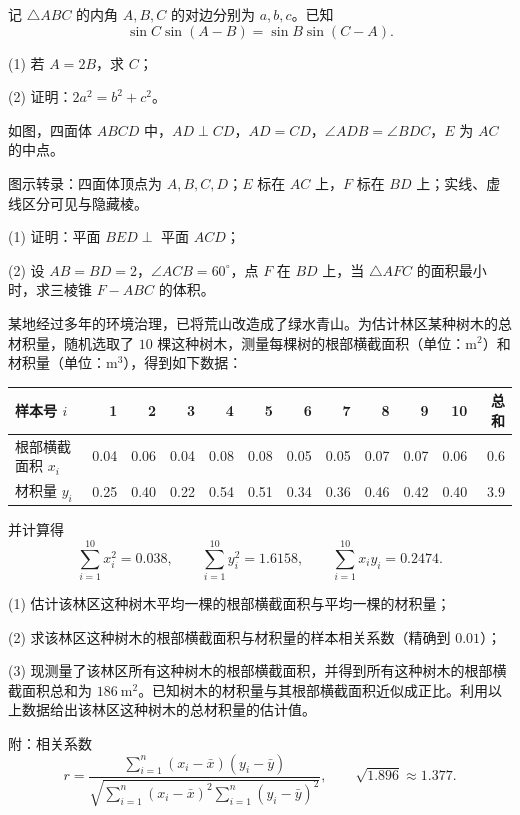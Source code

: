 \begin{question}
记 $\triangle ABC$ 的内角 $A,B,C$ 的对边分别为 $a,b,c$。已知
\nopagebreak[4]
\[
\sin C\sin(A-B)=\sin B\sin(C-A).
\]

(1) 若 $A=2B$，求 $C$；

(2) 证明：$2a^2=b^2+c^2$。

\Needspace{0.4\textheight}
\end{question}
\begin{question}
如图，四面体 $ABCD$ 中，$AD\perp CD$，$AD=CD$，$\angle ADB=\angle BDC$，$E$ 为 $AC$ 的中点。

图示转录：四面体顶点为 $A,B,C,D$；$E$ 标在 $AC$ 上，$F$ 标在 $BD$ 上；实线、虚线区分可见与隐藏棱。
\nopagebreak[4]
\begin{center}\end{center}
\nopagebreak[4]
(1) 证明：平面 $BED\perp$ 平面 $ACD$；

(2) 设 $AB=BD=2$，$\angle ACB=60^\circ$，点 $F$ 在 $BD$ 上，当 $\triangle AFC$ 的面积最小时，求三棱锥 $F-ABC$ 的体积。

\end{question}
\begin{question}
某地经过多年的环境治理，已将荒山改造成了绿水青山。为估计林区某种树木的总材积量，随机选取了 $10$ 棵这种树木，测量每棵树的根部横截面积（单位：$\mathrm m^2$）和材积量（单位：$\mathrm m^3$），得到如下数据：

\begin{center}
\begingroup\setlength{\tabcolsep}{4pt}
\begin{tabular}{lrrrrrrrrrrr}
\toprule
样本号 $i$ & 1 & 2 & 3 & 4 & 5 & 6 & 7 & 8 & 9 & 10 & 总和 \\
\midrule
根部横截面积 $x_i$ & 0.04 & 0.06 & 0.04 & 0.08 & 0.08 & 0.05 & 0.05 & 0.07 & 0.07 & 0.06 & 0.6 \\
材积量 $y_i$ & 0.25 & 0.40 & 0.22 & 0.54 & 0.51 & 0.34 & 0.36 & 0.46 & 0.42 & 0.40 & 3.9 \\
\bottomrule
\end{tabular}
\endgroup
\end{center}

并计算得
\nopagebreak[4]
\[
\sum_{i=1}^{10}x_i^2=0.038,\qquad
\sum_{i=1}^{10}y_i^2=1.6158,\qquad
\sum_{i=1}^{10}x_iy_i=0.2474.
\]

(1) 估计该林区这种树木平均一棵的根部横截面积与平均一棵的材积量；

(2) 求该林区这种树木的根部横截面积与材积量的样本相关系数（精确到 $0.01$）；

(3) 现测量了该林区所有这种树木的根部横截面积，并得到所有这种树木的根部横截面积总和为 $186\ \mathrm m^2$。已知树木的材积量与其根部横截面积近似成正比。利用以上数据给出该林区这种树木的总材积量的估计值。

附：相关系数
\nopagebreak[4]
\[
r=\frac{\sum_{i=1}^{n}(x_i-\bar x)(y_i-\bar y)}
{\sqrt{\sum_{i=1}^{n}(x_i-\bar x)^2\sum_{i=1}^{n}(y_i-\bar y)^2}},
\qquad \sqrt{1.896}\approx1.377.
\]

\end{question}
